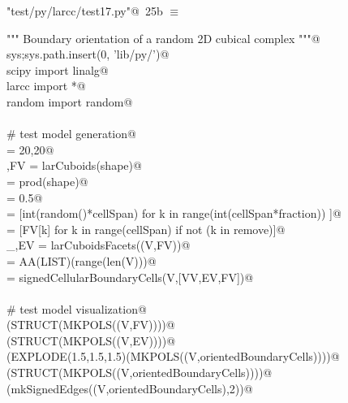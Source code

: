 \documentclass[11pt,oneside]{article}	%
\begin{document}
\begin{flushleft} \small \label{scrap44}
\protect{}\verb@"test/py/larcc/test17.py"@\nobreak\ {\footnotesize 25b }$\equiv$
\vspace{-1ex}
\begin{list}{}{} \item
\mbox{}\verb@""" Boundary orientation of a random 2D cubical complex """@\\
\mbox{}\verb@import sys;sys.path.insert(0, 'lib/py/')@\\
\mbox{}\verb@from scipy import linalg@\\
\mbox{}\verb@from larcc import *@\\
\mbox{}\verb@from random import random@\\
\mbox{}\verb@@\\
\mbox{}\verb@# test model generation@\\
\mbox{}\verb@shape = 20,20@\\
\mbox{}\verb@V,FV = larCuboids(shape)@\\
\mbox{}\verb@cellSpan = prod(shape)@\\
\mbox{}\verb@fraction = 0.5@\\
\mbox{}\verb@remove = [int(random()*cellSpan) for k in range(int(cellSpan*fraction)) ]@\\
\mbox{}\verb@FV = [FV[k] for k in range(cellSpan) if not (k in remove)]@\\
\mbox{}\verb@_,EV = larCuboidsFacets((V,FV))@\\
\mbox{}\verb@VV = AA(LIST)(range(len(V)))@\\
\mbox{}\verb@orientedBoundaryCells = signedCellularBoundaryCells(V,[VV,EV,FV])@\\
\mbox{}\verb@@\\
\mbox{}\verb@# test model visualization@\\
\mbox{}\verb@VIEW(STRUCT(MKPOLS((V,FV))))@\\
\mbox{}\verb@VIEW(STRUCT(MKPOLS((V,EV))))@\\
\mbox{}\verb@VIEW(EXPLODE(1.5,1.5,1.5)(MKPOLS((V,orientedBoundaryCells))))@\\
\mbox{}\verb@VIEW(STRUCT(MKPOLS((V,orientedBoundaryCells))))@\\
\mbox{}\verb@VIEW(mkSignedEdges((V,orientedBoundaryCells),2))@\\
\mbox{}\verb@@{\NWsep}
\end{list}
\vspace{-2ex}
\end{flushleft}
\end{document}
